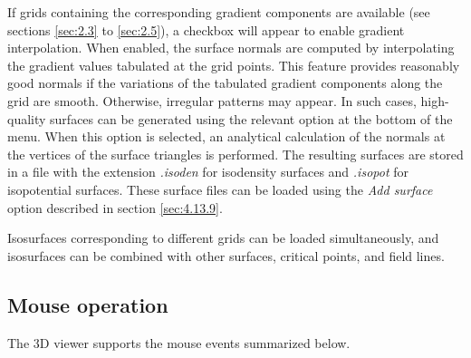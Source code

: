 \documentclass[10pt]{article}
\begin{document}
If grids containing the corresponding gradient components are available (see sections \ref{sec:2.3}
to \ref{sec:2.5}), a checkbox will appear to enable gradient interpolation. When enabled,
the surface normals are computed by interpolating the gradient values tabulated at the grid points.
This feature provides reasonably good normals if the variations
of the tabulated gradient components along the grid are smooth. Otherwise, irregular patterns may
appear. In such cases, high-quality 
surfaces can be generated 
using the relevant option at the bottom of the menu. When this option is selected,
an analytical calculation of the normals 
at the vertices of the surface triangles is performed.
The resulting surfaces are stored in a file with the extension 
{\it .isoden} for isodensity surfaces
and {\it .isopot} for isopotential surfaces. 
These surface files can be loaded using the {\it Add surface} option
described in section \ref{sec:4.13.9}.

Isosurfaces corresponding to different grids 
can be loaded simultaneously, and isosurfaces can be combined with other surfaces, critical points,
and field lines.

\subsection{Mouse operation \label{sec:4.14}}

The 3D viewer supports the mouse events summarized below.
\end{document}

